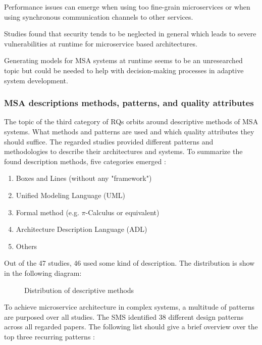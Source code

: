 Performance issues can emerge when using too fine-grain microservices
or when using synchronous communication channels to other services.

Studies found that security tends to be neglected in general which leads 
to severe vulnerabilities at runtime for microservice based architectures.

Generating models for MSA systems at runtime seems to be an unresearched
topic but could be needed to help with decision-making processes in
adaptive system development.


\subsubsection{MSA descriptions methods, patterns, and quality attributes}

The topic of the third category of RQs orbits around descriptive methods
of MSA systems. What methods and patterns are used and which
quality attributes they should suffice. The regarded studies provided
different patterns and methodologies to describe their architectures
and systems. To summarize the found description methods, five categories
emerged \cite{waseem:SMSMSADevOps}:

\begin{enumerate}
    \item Boxes and Lines (without any "framework")
    \item Unified Modeling Language (UML)
    \item Formal method (e.g. $\pi$-Calculus or equivalent)
    \item Architecture Description Language (ADL)
    \item Others
\end{enumerate}

Out of the 47 studies, 46 used some kind of description.
The distribution is show in the following diagram:

\begin{figure}[H]
    \caption{Distribution of descriptive methods}
\end{figure}

To achieve microservice architecture in complex systems, a multitude of
patterns are purposed over all studies. The SMS identified 38 different design
patterns across all regarded papers. The following list should give a brief
overview over the top three recurring patterns \cite{waseem:SMSMSADevOps}:

